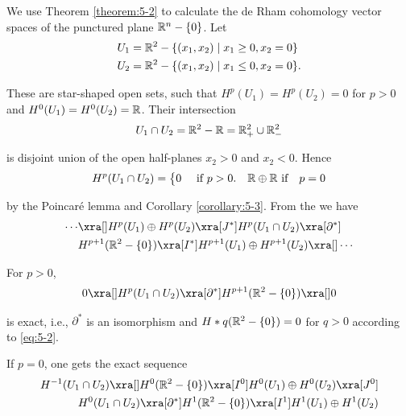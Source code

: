 \begin{example}\label{example:5-4}
  We use Theorem \ref{theorem:5-2} to calculate the de Rham cohomology vector spaces of the punctured plane $\mathbb{R}^n-\{0\}$. Let 
  \begin{align*}
    U_{1} & = \mathbb{R}^2-\{(x_1,x_2)\mid x_1\geq0, x_2=0\}\\
    U_{2} & = \mathbb{R}^2-\{(x_1,x_2)\mid x_1\leq0, x_2=0\}.
  \end{align*}

  These are star-shaped open sets, such that $H^p(U_1) = H^p(U_2) = 0$ for $p>0$ and $H^0(U_1) = H^0(U_2) = \mathbb{R}$. 
  Their intersection 
  \begin{align*}
    U_1\cap U_2 = \mathbb{R}^2-\mathbb{R} = \mathbb{R}^2_+\cup \mathbb{R}^2_-
  \end{align*}

  is disjoint union of the open half-planes $x_2>0$ and $x_2<0$. Hence 
  \begin{align}\label{eq:5-2}
    H^p(U_1\cap U_2) = \left\{\begin{aligned}
      & 0 && \text{ if } p>0.
      & \mathbb{R}\oplus\mathbb{R} \text{ if} && p = 0
    \end{aligned}\right.
  \end{align}

  by the Poincar\'e lemma and Corollary \ref{corollary:5-3}. From the  we have
  \begin{align*}
    \cdots  & \xra[] H^p(U_1)\oplus H^p(U_2)\xra[J^*]H^p(U_1\cap U_2)\xra[\partial^*]\\
            & H^{p+1}(\RR^2-\{0\})\xra[I^*] H^{p+1}(U_1)\oplus H^{p+1}(U_2)\xra[]\cdots
  \end{align*}
\end{example}

For $p>0$, 
\begin{align*}
  0\xra[] H^p(U_1\cap U_2)\xra[\partial^*] H^{p+1}(\RR^2-\{0\})\xra[] 0
\end{align*}

is exact, i.e., $\partial^*$ is an isomorphism and $H*q(\mathbb{R}^2-\{0\}) = 0$ for $q>0$ according 
to \eqref{eq:5-2}.

If $p=0$, one gets the exact sequence
\begin{align}\label{eq:5-3}
\begin{aligned}
  H^{-1}(U_1\cap U_2)\xra[] H^0(\RR^2-\{0\}) \xra[I^0] H^0(U_1)\oplus H^0(U_2)\xra[J^0] \\
  H^0(U_1\cap U_2)\xra[\partial^*] H^1(\RR^2-\{0\}) \xra[I^1]H^1(U_1)\oplus H^1(U_2)
\end{aligned}
\end{align}

